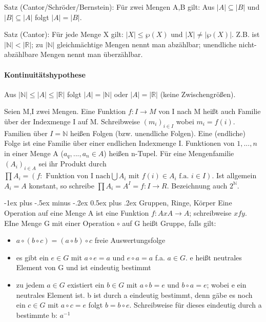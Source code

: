 \documentclass[10pt,landscape]{article}
\makeatletter
\renewcommand{\section}{\@startsection{section}{1}{0mm}%
                                {-1ex plus -.5ex minus -.2ex}%
                                {0.5ex plus .2ex}%
                                {\normalfont\large\bfseries}}
\makeatother
\begin{document}
\begin{multicols}{3}
Satz (Cantor/Schröder/Bernstein): 
Für zwei Mengen A,B gilt: Aus $|A|\subseteq |B|$ und $|B| \subseteq |A|$ folgt $|A| = |B|$.

Satz (Cantor):
Für jede Menge X gilt: $|X| \leq \wp(X)$ und $|X|\not= |\wp (X)|$. Z.B. ist $|\mathbb{N}|<|\mathbb{R}|$; zu $|\mathbb{N}|$ gleichmächtige Mengen nennt man abzählbar; unendliche nicht-abzählbare Mengen nennt man überzählbar.

\paragraph{Kontinuitätshypothese}
Aus $|\mathbb{N}|\leq |A| \leq |\mathbb{R}|$ folgt $|A|=|\mathbb{N}|$ oder $|A|=|\mathbb{R}|$ (keine Zwischengrößen).

Seien M,I zwei Mengen. Eine Funktion $f:I\rightarrow M$ von I nach M heißt auch Familie über der Indexmenge I auf M. Schreibweise $(m_i)_{i\in I}$ wobei $m_i=f(i)$. Familien über $I=\mathbb{N}$ heißen Folgen (bzw. unendliche Folgen).
Eine (endliche) Folge ist eine Familie über einer endlichen Indexmenge I. Funktionen von ${1,...,n}$ in einer Menge A ($a_q,...,a_n\in A$) heißen n-Tupel. Für eine Mengenfamilie $(A_i)_{i\in A}$ sei ihr Produkt durch $\prod A_i=(f: \text{ Funktion von I nach}\bigcup A_i \text{ mit } f(i)\in A_i \text{ f.a. } i\in I)$. Ist allgemein $A_i=A$ konstant, so schreibe $\prod A_i=A^I={f:I\rightarrow R}$. Bezeichnung auch $2^{\mathbb{N}}$.

\section{Gruppen, Ringe, Körper}
Eine Operation auf eine Menge A ist eine Funktion $f:AxA\rightarrow A$; schreibweise $xfy$. EIne Menge G mit einer Operation $\circ$ auf G heißt Gruppe, falls gilt:
\begin{itemize}
    \item $a\circ (b\circ c) = (a\circ b)\circ c$ freie Auswertungsfolge
    \item es gibt ein $e\in G$ mit $a\circ e=a$ und $e\circ a=a$ f.a. $a\in G$. e heißt neutrales Element von G und ist eindeutig bestimmt
    \item zu jedem $a\in G$ existiert ein $b\in G$ mit $a\circ b=e$ und $b\circ a=e$; wobei e ein neutrales Element ist. b ist durch a eindeutig bestimmt, denn gäbe es noch ein $c\in G$ mit $a\circ c=e$ folgt $b=b\circ e$. Schreibweise für dieses eindeutig durch a bestimmte b: $a^{-1}$
\end{itemize}


\end{multicols}
\end{document}
